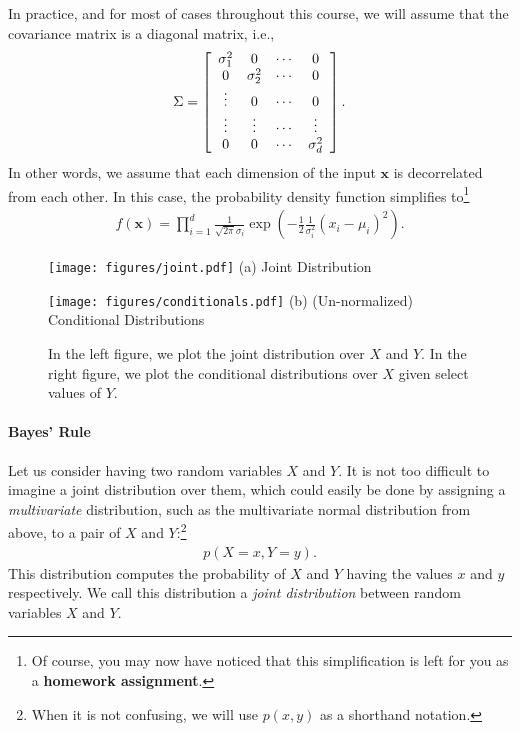 \documentclass{report}
\newcommand{\vect}[1]{\mathbf{#1}}
\newcommand{\vx}[0]{\vect{x}}
\begin{document}
In practice, and for most of cases throughout this course, we will assume that
the covariance matrix is a diagonal matrix, i.e.,
\begin{align*}
    \Sigma = \left[
        \begin{array}{c c c c}
            \sigma_1^2 & 0 & \cdots & 0 \\
            0 & \sigma_2^2 & \cdots & 0 \\
            \vdots & 0 & \cdots & 0 \\
            \vdots & \vdots & \cdots & \vdots \\
            0 & 0 & \cdots & \sigma_d^2 
        \end{array}
    \right].
\end{align*}
In other words, we assume that each dimension of the input $\vx$ is decorrelated
from each other. In this case, the probability density function simplifies
to\footnote{
    Of course, you may now have noticed that this simplification is left for you
    as a {\bf homework assignment}. 
}
\begin{align}
    \label{eq:gauss_pdf_diag}
    f(\vx) = \prod_{i=1}^d 
    \frac{1}{\sqrt{2\pi} \sigma_i}
    \exp\left(
        -\frac{1}{2} \frac{1}{\sigma_i^2}(x_i - \mu_i)^2
    \right).
\end{align}

\begin{figure}[t]
    \begin{minipage}{0.48\textwidth}
        \centering
        \texttt{[image: figures/joint.pdf]}
        (a) Joint Distribution
    \end{minipage}
    \hfill
    \begin{minipage}{0.48\textwidth}
        \centering
        \texttt{[image: figures/conditionals.pdf]}
        (b) (Un-normalized) Conditional Distributions
    \end{minipage}
    \caption{
        \label{fig:conditionals}
        In the left figure, we plot the joint distribution over $X$ and $Y$. In
        the right figure, we plot the conditional distributions over $X$ given
        select values of $Y$.
    }
\end{figure}

\paragraph{Bayes' Rule}

Let us consider having two random variables $X$ and $Y$. It is not too difficult
to imagine a joint distribution over them, which could easily be done by
assigning a {\it multivariate} distribution, such as the multivariate normal
distribution from above, to a pair of $X$ and $Y$:\footnote{
    When it is not confusing, we will use $p(x,y)$ as a shorthand notation.
}
\begin{align*}
    p(X=x, Y=y).
\end{align*}
This distribution computes the probability of $X$ and $Y$ having the values $x$
and $y$ respectively. We call this distribution a {\it joint distribution}
between random variables $X$ and $Y$.
\end{document}
